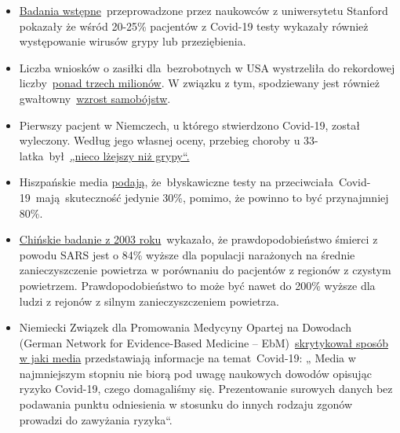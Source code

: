 \begin{itemize}
\tightlist
\item
  \href{https://medium.com/@nigam/higher-co-infection-rates-in-covid19-b24965088333}{Badania
  wstępne}~przeprowadzone przez naukowców z uniwersytetu Stanford
  pokazały że wśród 20-25\% pacjentów z Covid-19 testy wykazały również
  występowanie wirusów grypy lub przeziębienia.
\item
  Liczba wniosków o zasiłki dla~bezrobotnych w USA wystrzeliła do
  rekordowej
  liczby~\href{https://www.businessinsider.com/us-weekly-jobless-claims-record-coronavirus-unemployment-insurance-labor-recession-2020-3}{ponad
  trzech milionów}. W związku z tym, spodziewany jest również
  gwałtowny~\href{https://twitter.com/KoenSwinkels/status/1243066532390977544}{wzrost
  samobójstw}.
\item
  Pierwszy pacjent w Niemczech, u którego stwierdzono Covid-19, został
  wyleczony. Według jego własnej oceny, przebieg choroby u
  33-latka~był~\href{https://www.br.de/nachrichten/bayern/coronavirus-patient-nummer-1-wie-ich-die-quarantaene-erlebte,Rrm4Ul8}{„nieco
  lżejszy niż grypy``.}
\item
  Hiszpańskie media
  \href{https://elpais.com/sociedad/2020-03-25/los-test-rapidos-de-coronavirus-comprados-en-china-no-funcionan.html}{podają},
  że~błyskawiczne testy na przeciwciała~Covid-19~mają~skuteczność
  jedynie 30\%, pomimo, że powinno to być przynajmniej 80\%.
\item
  \href{https://ehjournal.biomedcentral.com/articles/10.1186/1476-069X-2-15}{Chińskie
  badanie z 2003 roku}~wykazało, że prawdopodobieństwo śmierci z powodu
  SARS jest o 84\% wyższe dla populacji narażonych na średnie
  zanieczyszczenie powietrza w porównaniu do pacjentów z regionów z
  czystym powietrzem. Prawdopodobieństwo to może być nawet do 200\%
  wyższe dla ludzi z rejonów z silnym zanieczyszczeniem powietrza.
\item
  Niemiecki Związek dla Promowania Medycyny Opartej na Dowodach (German
  Network for Evidence-Based Medicine --
  EbM)~\href{https://www.ebm-netzwerk.de/en/publications/covid-19}{skrytykował
  sposób w jaki media} przedstawiają informacje na temat~Covid-19: „
  Media w najmniejszym stopniu nie biorą pod uwagę naukowych dowodów
  opisując ryzyko Covid-19, czego domagaliśmy się. Prezentowanie
  surowych danych bez podawania punktu odniesienia w stosunku do innych
  rodzaju zgonów prowadzi do zawyżania ryzyka``.
\end{itemize}

